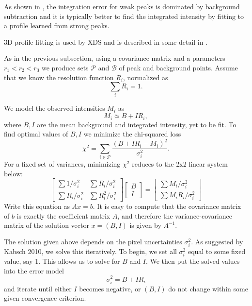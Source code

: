 \documentclass[11pt,a4paper]{article}
\newcommand{\calP}{\mathcal{P}}
\newcommand{\calB}{\mathcal{B}}
\begin{document}
As shown in \cite{Dia69}, the integration error for weak peaks is dominated by background subtraction
and it is typically better to find the integrated intensity by fitting to a profile learned from strong peaks.

3D profile fitting is used by XDS \cite{Kab10a} and is described in some detail in \cite{Kab88,Kab10b}.

As in the previous subsection, using a covariance matrix and a parameters $r_1 < r_2 < r_3$ we produce sets $\calP$ and $\calB$ of peak and background points.
Assume that we know the resolution function $R_i$,
normalized as
\begin{equation}\label{Eresnor}
  \sum_i R_i = 1.
\end{equation}

We model the observed intensities $M_i$ as
\begin{equation} M_i \simeq B + I R_i, \end{equation}
where $B, I$ are the mean background and integrated intensity, yet to be fit. To find optimal values of $B,I$ we minimize the chi-squared loss
\begin{equation} \chi^2 = \sum_{i \in \calP} \frac{(B+IR_i - M_i)^2}{\sigma^2_i}. \end{equation}
For a fixed set of variances, minimizing $\chi^2$ reduces to the 2x2 linear system below:
\begin{equation} \begin{bmatrix}
  \sum 1/\sigma^2_i & \sum R_i / \sigma^2_i \\
  \sum R_i/\sigma_i^2 & \sum R_i^2 / \sigma^2_i
\end{bmatrix}
\begin{bmatrix} B \\ I \end{bmatrix}
 = \begin{bmatrix} \sum M_i/\sigma^2_i \\ \sum M_i R_i / \sigma^2_i \end{bmatrix} \end{equation}
 Write this equation as $Ax = b$. It is easy to compute that the covariance matrix of $b$ is exactly the coefficient matrix
 $A$, and therefore the variance-covariance matrix of the solution vector $x = (B, I)$ is given by $A^{-1}$.

The solution given above depends on the pixel uncertainties $\sigma_i^2$. As suggested by Kabsch 2010, we solve this iteratively. To begin, we set all $\sigma^2_i$ equal to some fixed value, say 1. This allows us to solve for $B$ and $I$. We then put the solved values into the error model
\begin{equation} \sigma_i^2 = B + I R_i \end{equation}
and iterate until either $I$ becomes negative, or $(B, I)$ do not change within some given convergence criterion.
\end{document}
